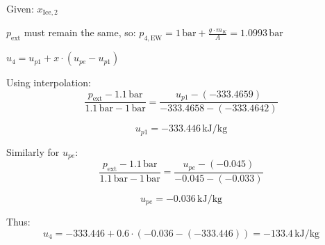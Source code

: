 Given: \( x_{\text{Ice},2} \)  

\( p_{\text{ext}} \) must remain the same, so:  
\( p_{4,\text{EW}} = 1 \, \text{bar} + \frac{g \cdot m_{K}}{A} = 1.0993 \, \text{bar} \)  

\( u_{4} = u_{p1} + x \cdot (u_{pe} - u_{p1}) \)  

Using interpolation:  
\[
\frac{p_{\text{ext}} - 1.1 \, \text{bar}}{1.1 \, \text{bar} - 1 \, \text{bar}} = \frac{u_{p1} - (-333.4659)}{-333.4658 - (-333.4642)}
\]  

\[
u_{p1} = -333.446 \, \text{kJ/kg}
\]  

Similarly for \( u_{pe} \):  
\[
\frac{p_{\text{ext}} - 1.1 \, \text{bar}}{1.1 \, \text{bar} - 1 \, \text{bar}} = \frac{u_{pe} - (-0.045)}{-0.045 - (-0.033)}
\]  

\[
u_{pe} = -0.036 \, \text{kJ/kg}
\]  

Thus:  
\[
u_{4} = -333.446 + 0.6 \cdot (-0.036 - (-333.446)) = -133.4 \, \text{kJ/kg}
\]